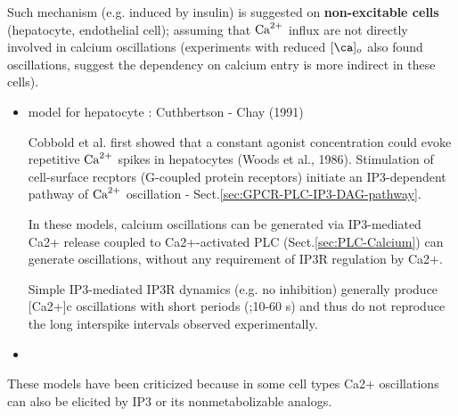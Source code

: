 Such mechanism (e.g. induced by insulin) is suggested on {\bf
non-excitable cells} (hepatocyte, endothelial cell); assuming that ${\text{Ca}^{2+}}$ influx
are not directly involved in calcium oscillations (experiments with reduced
$[\ca]_o$ also found oscillations, suggest the dependency on calcium entry is
more indirect in these cells).

\begin{itemize}
  \item model for hepatocyte : Cuthbertson - Chay (1991)

Cobbold et al. first showed that a constant agonist concentration could evoke
repetitive ${\text{Ca}^{2+}}$ spikes in hepatocytes (Woods et al., 1986). Stimulation of
cell-surface recptors (G-coupled protein receptors) initiate an IP3-dependent
pathway of ${\text{Ca}^{2+}}$ oscillation - Sect.\ref{sec:GPCR-PLC-IP3-DAG-pathway}.

In these models, calcium oscillations can be generated via IP3-mediated Ca2+
release coupled to Ca2+-activated PLC (Sect.\ref{sec:PLC-Calcium}) can generate
oscillations, without any requirement of IP3R regulation by Ca2+.

Simple IP3-mediated IP3R dynamics (e.g. no inhibition) generally produce
[Ca2+]c oscillations with short periods (;10-60 s) and thus do not reproduce the
long interspike intervals observed experimentally.

  \item 
\end{itemize}

These models have been criticized because in some cell types Ca2+ oscillations
can also be elicited by IP3 or its nonmetabolizable analogs.


